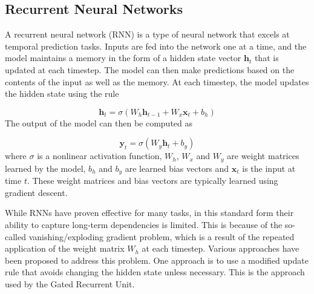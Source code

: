 \subsection*{Recurrent Neural Networks}

A recurrent neural network (RNN) is a type of neural network that excels at temporal prediction tasks. Inputs are fed into the network one at a time, and the model maintains a memory in the form of a hidden state vector \(\mathbf{h}_t\) that is updated at each timestep. The model can then make predictions based on the contents of the input as well as the memory. At each timestep, the model updates the hidden state using the rule

\[ \mathbf{h}_t = \sigma(W_h \mathbf{h}_{t-1} + W_x \mathbf{x}_t + b_h) \]
The output of the model can then be computed as

\[ \mathbf{y}_t = \sigma(W_y \mathbf{h}_t + b_y) \]
where \(\sigma\) is a nonlinear activation function, \(W_h\), \(W_x\) and \(W_y\) are weight matrices learned by the model, \(b_h\) and \(b_y\) are learned bias vectors and \(\mathbf{x}_t\) is the input at time \(t\). These weight matrices and bias vectors are typically learned using gradient descent.


While RNNs have proven effective for many tasks, in this standard form their ability to capture long-term dependencies is limited. This is because of the so-called vanishing/exploding gradient problem, which is a result of the repeated application of the weight matrix \(W_h\) at each timestep.
Various approaches have been proposed to address this problem. One approach is to use a modified update rule that avoids changing the hidden state unless necessary. This is the approach used by the Gated Recurrent Unit.